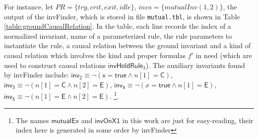 \documentclass[final]{IEEEtran}
\def \eqc {=}
\def \andc {\wedge }
\def \negc {\lnot}
\begin{document}

For instance, let $PR=\{try, crit, exit, idle\}$, $invs=\{mutualInv(1,2)\}$,    the output of the {\sf invFinder}, which is stored in file {\tt mutual.tbl},  is shown in Table
\ref{table:groundCausalRelation}. In the table,  each line records the    index of a normalized   invariant, name of a parameterized rule, the rule
  parameters to instantiate the rule, a causal relation between
  the ground invariant and a kind of causal relation which involves the kind and proper formulas
  $f'$   in need (which are used to construct
      causal relations $\mathsf{invHoldRule}_3$). The auxiliary invariants found by {\sf invFinder} include: $\mathsf{inv_2}  \equiv  \negc (\mathsf{x} \eqc \mathsf{true}  \andc  n[1]=\mathsf{C})$, $\mathsf{inv_3}    \equiv \negc  ( n[1]=\mathsf{C} \andc n[2]=\mathsf{E})$,
$\mathsf{inv_4}  \equiv  \negc (x \eqc \mathsf{true}  \andc  n[1]\eqc \mathsf{E})$,   $\mathsf{inv_5}    \equiv \negc  ( n[1]\eqc \mathsf{E} \andc n[2] \eqc \mathsf{E})$.  \footnote{The names $\mathsf{mutualEx}$ and $\mathsf{invOnX1}$ in
  this work are just for easy-reading, their
 index here is generated  in some order by {\sf invFinder}}.


\end{document}
